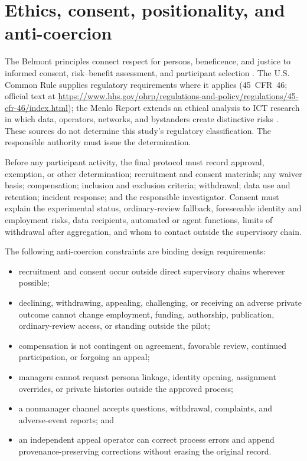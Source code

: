 \documentclass[11pt]{article}
\begin{document}
\section{Ethics, consent, positionality, and anti-coercion}

The Belmont principles connect respect for persons, beneficence, and justice to
informed consent, risk--benefit assessment, and participant selection
\citep{belmont1979}. The U.S. Common Rule supplies regulatory requirements where it
applies (45~CFR~46; official text at
\url{https://www.hhs.gov/ohrp/regulations-and-policy/regulations/45-cfr-46/index.html});
the Menlo Report extends an ethical analysis to ICT
research in which data, operators, networks, and bystanders create distinctive
risks \citep{menlo2012}. These sources do not determine this study's regulatory
classification. The responsible authority must issue the determination.

Before any participant activity, the final protocol must record approval,
exemption, or other determination; recruitment and consent materials; any waiver
basis; compensation; inclusion and exclusion criteria; withdrawal; data use and
retention; incident response; and the responsible investigator. Consent must
explain the experimental status, ordinary-review fallback, foreseeable identity
and employment risks, data recipients, automated or agent functions, limits of
withdrawal after aggregation, and whom to contact outside the supervisory chain.

The following anti-coercion constraints are binding design requirements:

\begin{itemize}
  \item recruitment and consent occur outside direct supervisory chains wherever
  possible;
  \item declining, withdrawing, appealing, challenging, or receiving an adverse
  private outcome cannot change employment, funding, authorship, publication,
  ordinary-review access, or standing outside the pilot;
  \item compensation is not contingent on agreement, favorable review, continued
  participation, or forgoing an appeal;
  \item managers cannot request persona linkage, identity opening, assignment
  overrides, or private histories outside the approved process;
  \item a nonmanager channel accepts questions, withdrawal, complaints, and
  adverse-event reports; and
  \item an independent appeal operator can correct process errors and append
  provenance-preserving corrections without erasing the original record.
\end{itemize}
\end{document}
